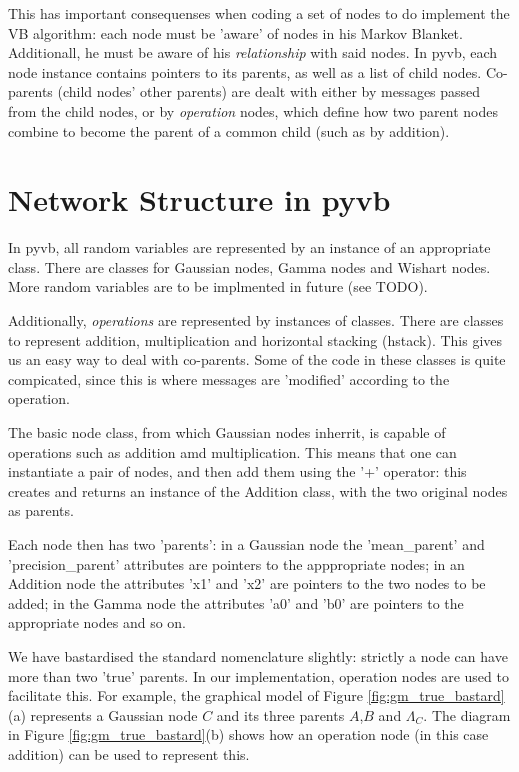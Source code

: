 \documentclass{article}
\newcommand{\<}{\langle}
\renewcommand{\>}{\rangle}
\begin{document}
This has important consequenses when coding a set of nodes to do implement the VB algorithm: each node must be 'aware' of nodes in his Markov Blanket. Additionall, he must be aware of his {\em relationship} with said nodes. In pyvb, each node instance contains pointers to its parents, as well as a list of child nodes.  Co-parents (child nodes' other parents) are dealt with either by messages passed from the child nodes, or by {\em operation} nodes, which define how two parent nodes combine to become the parent of a common child (such as by addition).  

\section{Network Structure in pyvb}
In pyvb, all random variables are represented by an instance of an appropriate class. There are classes for Gaussian nodes, Gamma nodes and Wishart nodes. More random variables are to be implmented in future (see TODO).

Additionally, {\em operations} are represented by instances of classes. There are classes to represent addition, multiplication and horizontal stacking (hstack).  This gives us an easy way to deal with co-parents.  Some of the code in these classes is quite compicated, since this is where messages are 'modified' according to the operation.  

The basic node class, from which Gaussian nodes inherrit, is capable of operations such as addition amd multiplication. This means that one can instantiate a pair of nodes, and then add them using the '+' operator: this creates and returns an instance of the Addition class, with the two original nodes as parents. 

Each node then has two 'parents': in a Gaussian node the 'mean\_parent' and 'precision\_parent' attributes are pointers to the apppropriate nodes; in an Addition node the attributes 'x1' and 'x2' are pointers to the two nodes to be added; in the Gamma node the attributes 'a0' and 'b0' are pointers to the appropriate nodes and so on.

We have bastardised the standard nomenclature slightly: strictly a node can have more than two 'true' parents. In our implementation, operation nodes are used to facilitate this. For example, the graphical model of Figure \ref{fig:gm_true_bastard}(a) represents a Gaussian node $C$ and its three parents $A$,$B$ and $\Lambda_C$.  The diagram in Figure \ref{fig:gm_true_bastard}(b) shows how an operation node (in this case addition) can be used to represent this. 
\end{document}
